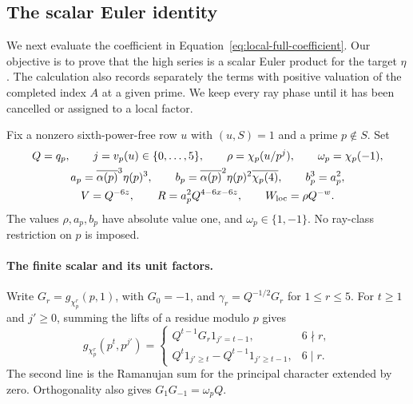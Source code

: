 \documentclass[11pt,a4paper]{article}
\numberwithin{equation}{section}
\numberwithin{figure}{section}
\theoremstyle{definition}
\theoremstyle{remark}
\begin{document}
\subsection{The scalar Euler identity}
\label{sec:local-euler}

We next evaluate the coefficient in
Equation~\eqref{eq:local-full-coefficient}.  Our objective is to prove
that the high series is a scalar Euler product for the target $\eta$.
The calculation also records separately the terms with positive valuation
of the completed index $A$ at a given prime.  We keep every ray phase until
it has been cancelled or assigned to a local factor.

Fix a nonzero sixth-power-free row $u$ with $(u,S)=1$ and a prime
$p\notin S$.  Set
\begin{equation}\label{eq:local-parameters}
 \begin{gathered}
 Q=q_p,\qquad j=v_p(u)\in\{0,\ldots,5\},\qquad
 \rho=\chi_p(u/p^j),\qquad \omega_p=\chi_p(-1),\\
 a_p=\overline{\alpha(p)}^3\eta(p)^3,\qquad
 b_p=\overline{\alpha(p)}^2\eta(p)^2\overline{\chi_p(4)},
 \qquad b_p^3=a_p^2,\\
 V=Q^{-6z},\qquad R=a_p^2Q^{4-6x-6z},\qquad
 W_{\rm loc}=\rho Q^{-w}.
 \end{gathered}
\end{equation}
The values $\rho,a_p,b_p$ have absolute value one, and
$\omega_p\in\{1,-1\}$.  No ray-class restriction on $p$ is imposed.

\paragraph{The finite scalar and its unit factors.}
Write $G_r=g_{\chi_p^r}(p,1)$, with $G_0=-1$, and
$\gamma_r=Q^{-1/2}G_r$ for $1\le r\le5$.  For $t\ge1$ and
$j'\ge0$, summing the lifts of a residue modulo $p$ gives
\[
 g_{\chi_p^r}(p^t,p^{j'})=
 \begin{cases}
 Q^{t-1}G_r1_{j'=t-1},&6\nmid r,\\
 Q^t1_{j'\ge t}-Q^{t-1}1_{j'\ge t-1},&6\mid r.
 \end{cases}
\]
The second line is the Ramanujan sum for the principal character
extended by zero.  Orthogonality also gives
$G_1G_{-1}=\omega_pQ$.
\end{document}
